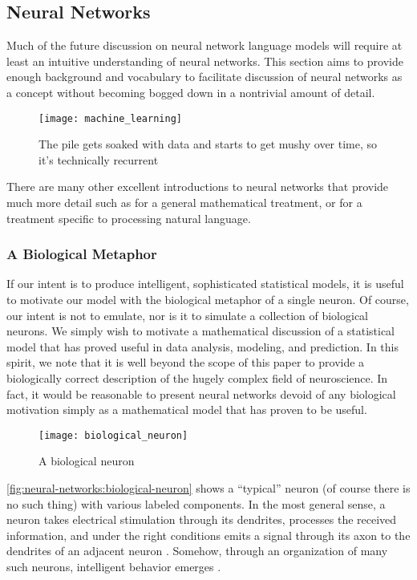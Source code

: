 \subsection{Neural Networks}\label{sec:introduction:neural-networks}

Much of the future discussion on neural network language models will require at least an intuitive understanding of neural networks.
This section aims to provide enough background and vocabulary to facilitate discussion of neural networks as a concept without becoming bogged down in a nontrivial amount of detail.
\begin{figure}[h]
    \centering
    \texttt{[image: machine\_learning]}
    \caption{The pile gets soaked with data and starts to get mushy over time, so it's technically recurrent \cite{xkcd_machine_learning}}\label{fig:neural-networks:xkcd-machine-learning}
\end{figure}
There are many other excellent introductions to neural networks that provide much more detail such as \cite{goodfellow_bengio_courville_2016} for a general mathematical treatment, or \cite{goldberg_2017} for a treatment specific to processing natural language.

\subsubsection{A Biological Metaphor}\label{sec:neural-networks-biological-metaphor}

If our intent is to produce intelligent, sophisticated statistical models, it is useful to motivate our model with the biological metaphor of a single neuron.
Of course, our intent is not to emulate, nor is it to simulate a collection of biological neurons.
We simply wish to motivate a mathematical discussion of a statistical model that has proved useful in data analysis, modeling, and prediction.
In this spirit, we note that it is well beyond the scope of this paper to provide a biologically correct description of the hugely complex field of neuroscience.
In fact, it would be reasonable to present neural networks devoid of any biological motivation simply as a mathematical model that has proven to be useful.
\begin{figure}[h]
    \centering
    \texttt{[image: biological\_neuron]}
    \caption{A biological neuron \cite{bio_neuron}}\label{fig:neural-networks:biological-neuron}
\end{figure}
\autoref{fig:neural-networks:biological-neuron} shows a ``typical'' neuron (of course there is no such thing) with various labeled components.
In the most general sense, a neuron takes electrical stimulation through its dendrites, processes the received information, and under the right conditions emits a signal through its axon to the dendrites of an adjacent neuron \cite{bio_neuron}.
Somehow, through an organization of many such neurons, intelligent behavior emerges \cite{castro_2006}.

